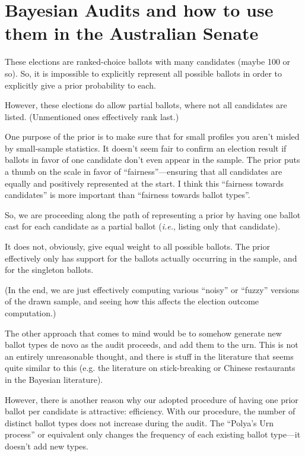 \documentclass[10pt,a4paper]{article}
\newcommand{\VTNote}[1]{}
\newcommand{\longVersion}[1]{#1}
\newcommand{\longVersion}[1]{}
\begin{document}
\longVersion{
\section{Bayesian Audits and how to use them in the Australian Senate}
\label{sec:bayes}
\VTNote{Currently just copying Ron's email.}

These elections are ranked-choice ballots with many candidates (maybe 100 or
so).  So, it is impossible to explicitly represent all possible ballots in
order to explicitly give a prior probability to each.  

However, these elections do allow partial ballots, where not
all candidates are listed. (Unmentioned ones effectively rank last.)

One purpose of the prior is to make sure that for small profiles you
aren't misled by small-sample statistics.  It doesn't seem fair
to confirm an election result if ballots in favor of one candidate don't
even appear in the sample.   The prior puts a thumb on the scale in
favor of ``fairness''---ensuring that all candidates are equally and
positively represented at the start.  I think this ``fairness towards
candidates'' is more important than ``fairness towards ballot types''.

So, we are proceeding along the path of representing a prior by
having one ballot cast for each candidate as a partial ballot ({\it i.e.},
listing only that candidate).  

It does not, obviously, give equal weight to all possible ballots.
The prior effectively only has support for the ballots actually 
occurring in the sample, and for the singleton ballots.  

(In the end, we are just effectively computing various ``noisy''
or ``fuzzy'' versions of the drawn sample, and seeing how this
affects the election outcome computation.)

The other approach that comes to mind would be to somehow generate
new ballot types de novo as the audit proceeds, and add them to
the urn.  This is not an entirely unreasonable thought, and there
is stuff in the literature that seems quite similar to this (e.g. the
literature on stick-breaking or Chinese restaurants in the Bayesian
literature).

However, there is another reason why our adopted procedure 
of having one prior ballot per candidate is attractive: efficiency.
With our procedure, the number of distinct ballot types does
not increase during the audit.  The ``Polya's Urn process'' or
equivalent only changes the frequency of each existing ballot
type---it doesn't add new types.

}
\end{document}
